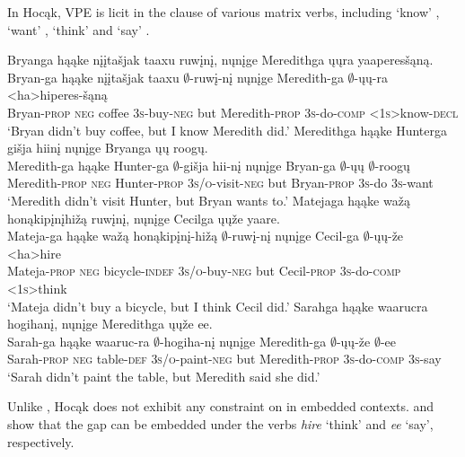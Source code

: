 \documentclass[output=paper]{LSP/langsci}
\begin{document}
 
In Hocąk, VPE is licit in the  clause of various matrix verbs, including `know' , `want' , `think'  and `say' .
 


 
\ea
\ea\label{ex:johnson:38a} 
\glll Bryanga hąąke {nįįtašjak taaxu} ruwįnį, nųnįge Meredithga ųųra yaaperesšąną.\\
Bryan-ga hąąke {nįįtašjak taaxu} $\emptyset$-ruwį-nį nųnįge Meredith-ga $\emptyset$-ųų-ra <ha>hiperes-šąną\\
Bryan-\textsc{prop} \textsc{neg} coffee \textsc{3s}-buy-\textsc{neg} but Meredith-\textsc{prop} \textsc{3s}-do-\textsc{comp} <\textsc{1s}>know-\textsc{decl}\\
\trans `Bryan didn't buy coffee, but I know Meredith did.'
\ex\label{ex:johnson:38b}
\glll Meredithga hąąke Hunterga {gišja hiinį} nųnįge Bryanga ųų roogų.\\
Meredith-ga hąąke Hunter-ga $\emptyset$-{gišja hii-nį} nųnįge Bryan-ga $\emptyset$-ųų $\emptyset$-roogų\\
Meredith-\textsc{prop} \textsc{neg} Hunter-\textsc{prop} \textsc{3s/o}-visit-\textsc{neg} but Bryan-\textsc{prop} \textsc{3s}-do \textsc{3s}-want\\
\trans `Meredith didn't visit Hunter, but Bryan wants to.'
\ex\label{ex:johnson:38c}
\glll Matejaga hąąke {wažą honąkipįnįhižą} ruwįnį, nųnįge Cecilga ųųže yaare.\\
Mateja-ga hąąke {wažą honąkipįnį-hižą} $\emptyset$-ruwį-nį nųnįge Cecil-ga $\emptyset$-ųų-že <ha>hire\\
Mateja-\textsc{prop} \textsc{neg} bicycle-\textsc{indef} \textsc{3s/o}-buy-\textsc{neg} but Cecil-\textsc{prop} \textsc{3s}-do-\textsc{comp} <\textsc{1s}>think\\
\trans `Mateja didn't buy a bicycle, but I think Cecil did.'
\ex\label{ex:johnson:38d}
\glll Sarahga hąąke waarucra hogihanį, nųnįge Meredithga ųųže ee.\\
Sarah-ga hąąke waaruc-ra $\emptyset$-hogiha-nį nųnįge Meredith-ga $\emptyset$-ųų-že $\emptyset$-ee\\
Sarah-\textsc{prop} \textsc{neg} table-\textsc{def} \textsc{3s/o}-paint-\textsc{neg} but Meredith-\textsc{prop} \textsc{3s}-do-\textsc{comp} \textsc{3s}-say\\
\trans `Sarah didn't paint the table, but Meredith said she did.'
\z
\z

Unlike , Hocąk does not exhibit any constraint on  in embedded contexts.  and  show that the gap can be embedded under the verbs \emph{hire} `think' and \emph{ee} `say', respectively.
\end{document}
